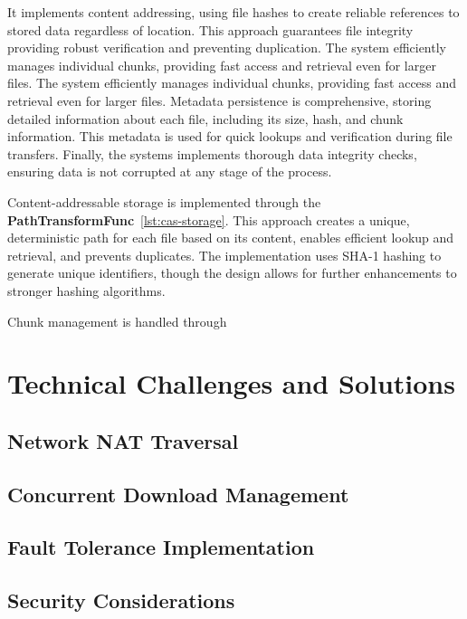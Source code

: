 \documentclass[12pt,a4paper]{report}
\begin{document}
It implements content addressing, using file hashes to create reliable references to stored data regardless of location. This approach guarantees file integrity providing robust verification and preventing duplication. The system efficiently manages individual chunks, providing fast access and retrieval even for larger files. The system efficiently manages individual chunks, providing fast access and retrieval even for larger files. Metadata persistence is comprehensive, storing detailed information about each file, including its size, hash, and chunk information. This metadata is used for quick lookups and verification during file transfers. Finally, the systems implements thorough data integrity checks, ensuring data is not corrupted at any stage of the process.

Content-addressable storage is implemented through the \textbf{PathTransformFunc}~\ref{lst:cas-storage}. This approach creates a unique, deterministic path for each file based on its content, enables efficient lookup and retrieval, and prevents duplicates. The implementation uses SHA-1 hashing to generate unique identifiers, though the design allows for further enhancements to stronger hashing algorithms.

Chunk management is handled through 

\chapter{Technical Challenges and Solutions}
\section{Network NAT Traversal}

\section{Concurrent Download Management}

\section{Fault Tolerance Implementation}

\section{Security Considerations}
\end{document}
